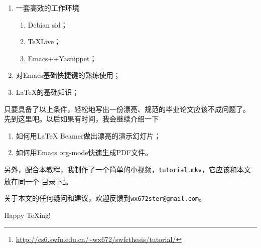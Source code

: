 \begin{enumerate}
\item 一套高效的工作环境
  \begin{enumerate}
  \item Debian sid；
  \item \TeX{}Live；
  \item Emacs+\auctex{}+Yasnippet；
  \end{enumerate}
\item 对Emacs基础快捷键的熟练使用；
\item \LaTeX{}的基础知识；
\end{enumerate}

只要具备了以上条件，轻松地写出一份漂亮、规范的毕业论文应该不成问题了。
先到这里吧。以后如果有时间，我会继续介绍一下

\begin{enumerate}
\item 如何用\LaTeX{} Beamer做出漂亮的演示幻灯片；
\item 如何用Emacs org-mode快速生成PDF文件。
\end{enumerate}

另外，配合本教程，我制作了一个简单的小视频，\texttt{tutorial.mkv}，它应该和本文放在同一个
目录下\footnote{\url{http://cs6.swfu.edu.cn/~wx672/swfcthesis/tutorial/}}。

关于本文的任何疑问和建议，欢迎反馈到\texttt{wx672ster@gmail.com}。

\begin{flushright}
  {\Huge {}Happy \TeX{}ing!}
\end{flushright}

